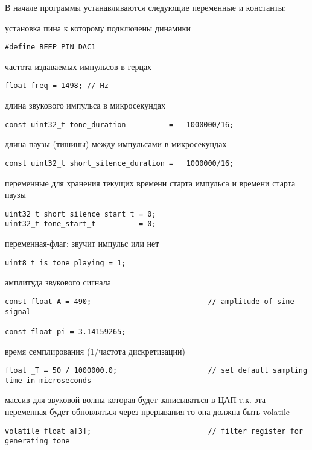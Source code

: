 \documentclass[../main.tex]{subfiles}
\begin{document}
В начале программы устанавливаются следующие переменные и константы:

установка пина к которому подключены динамики
\begin{lstlisting}
#define BEEP_PIN DAC1
\end{lstlisting}

частота издаваемых импульсов в герцах
\begin{lstlisting}
float freq = 1498; // Hz
\end{lstlisting}

длина звукового импульса в микросекундах
\begin{lstlisting}
const uint32_t tone_duration          =   1000000/16;
\end{lstlisting}

длина паузы (тишины) между импульсами в микросекундах
\begin{lstlisting}
const uint32_t short_silence_duration =   1000000/16;
\end{lstlisting}

переменные для хранения текущих времени старта импульса и времени старта паузы
\begin{lstlisting}
uint32_t short_silence_start_t = 0;
uint32_t tone_start_t          = 0;
\end{lstlisting}

переменная-флаг: звучит импульс или нет
\begin{lstlisting}
uint8_t is_tone_playing = 1;
\end{lstlisting}

амплитуда звукового сигнала
\begin{lstlisting}
const float A = 490;                           // amplitude of sine signal

const float pi = 3.14159265;
\end{lstlisting}

время семплирования (1/частота дискретизации)
\begin{lstlisting}
float _T = 50 / 1000000.0;                     // set default sampling time in microseconds
\end{lstlisting}

массив для звуковой волны которая будет записываться в ЦАП
т.к. эта переменная будет обновляться через прерывания то она должна быть volatile
\begin{lstlisting}
volatile float a[3];                           // filter register for generating tone
\end{lstlisting}
\end{document}
